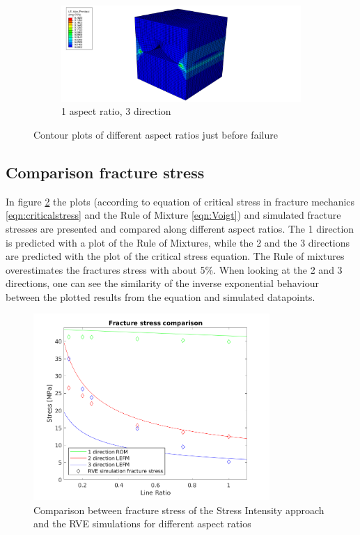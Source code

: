 \begin{figure}
  \begin{subfigure}[b]{0.80\textwidth}
    \includegraphics[width=\textwidth]{chapter_7_non-elasticmodelling/figures/1p3.png}
    \caption{1 aspect ratio, 3 direction}
  \end{subfigure}
  \caption{Contour plots of different aspect ratios just before failure}
  \label{fig:Contourplot}
\end{figure}

\subsection{Comparison fracture stress}
In figure \ref{fig:fracturestress} the plots (according to equation of critical stress in fracture mechanics \ref{eqn:criticalstress} and the Rule of Mixture \ref{eqn:Voigt}) and simulated fracture stresses are presented and compared along different aspect ratios. The 1 direction is predicted with a plot of the Rule of Mixtures, while the 2 and the 3 directions are predicted with the plot of the critical stress equation. The Rule of mixtures overestimates the fractures stress with about 5\%. 
When looking at the 2 and 3 directions, one can see the similarity of the inverse exponential behaviour between the plotted results from the equation and simulated datapoints. 


\begin{figure}[H]
    \centering
    \includegraphics[width=0.80\textwidth]{chapter_7_non-elasticmodelling/figures/yieldstress.png}
    \caption{Comparison between fracture stress of the Stress Intensity approach and the RVE simulations for different aspect ratios}
    \label{fig:fracturestress}
\end{figure}
